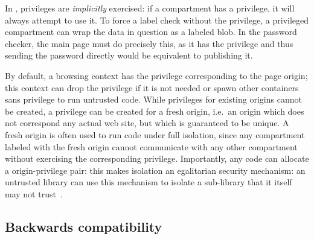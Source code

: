 In \sys{}, privileges are \emph{implicitly} exercised: if a compartment
has a privilege, it will always attempt to use it.  To force a label
check without the privilege, a privileged compartment can wrap the
data in question as a labeled blob.  In the password checker, the main
page must do precisely this, as it has the  privilege and
thus sending the password directly would be equivalent to publishing it.

By default, a browsing context has the privilege corresponding to the
page origin; this context can drop the privilege if it is not
needed or spawn other containers sans privilege to run untrusted code.
%
While privileges for existing origins cannot be created, a privilege can
be created for a fresh origin, i.e.\ an origin which does not correspond
any actual web site, but which is guaranteed to be unique.
%
A fresh origin is often used to run code under full isolation, since any
compartment labeled with the fresh origin cannot communicate with any
other compartment without exercising the corresponding privilege.
%
Importantly, any code can allocate a origin-privilege pair: this
makes isolation an egalitarian security mechanism: an untrusted library
can use this mechanism to isolate a sub-library that it itself
may not trust~\cite{Zeldovich:2006}.

\subsection{Backwards compatibility}
\label{sec:bc}




